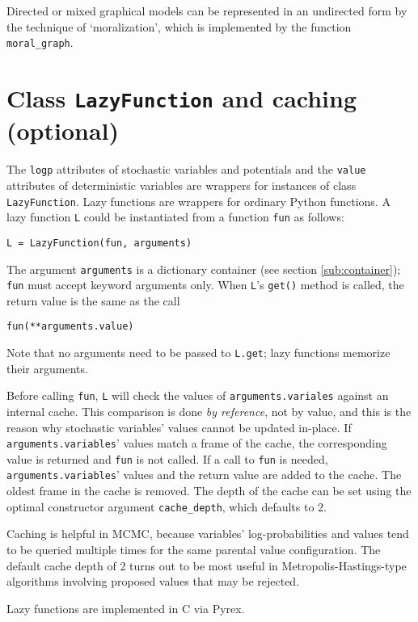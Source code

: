 Directed or mixed graphical models can be represented in an undirected form by the technique of `moralization', which is implemented by the function \texttt{moral_graph}.

\section{Class \texttt{LazyFunction} and caching (optional)}
\label{sec:caching} 

The \texttt{logp} attributes of stochastic variables and potentials and the \texttt{value} attributes of deterministic variables are wrappers for instances of class \texttt{LazyFunction}. Lazy functions are wrappers for ordinary Python functions. A lazy function \texttt{L} could be instantiated from a function \texttt{fun} as follows:
\begin{verbatim}
L = LazyFunction(fun, arguments)
\end{verbatim}
The argument \texttt{arguments} is a dictionary container (see section \ref{sub:container}); \texttt{fun} must accept keyword arguments only. When \texttt{L}'s \texttt{get()} method is called, the return value is the same as the call 
\begin{verbatim}
fun(**arguments.value)
\end{verbatim}
Note that no arguments need to be passed to \texttt{L.get}; lazy functions memorize their arguments.

Before calling \texttt{fun}, \texttt{L} will check the values of \texttt{arguments.variales} against an internal cache. This comparison is done \emph{by reference}, not by value, and this is the reason why stochastic variables' values cannot be updated in-place. If \texttt{arguments.variables}' values match a frame of the cache, the corresponding value is returned and \texttt{fun} is not called. If a call to \texttt{fun} is needed, \texttt{arguments.variables}' values and the return value are added to the cache. The oldest frame in the cache is removed. The depth of the cache can be set using the optimal constructor argument \texttt{cache_depth}, which defaults to 2.

Caching is helpful in MCMC, because variables' log-probabilities and values tend to be queried multiple times for the same parental value configuration. The default cache depth of 2 turns out to be most useful in Metropolis-Hastings-type algorithms involving proposed values that may be rejected.

Lazy functions are implemented in C via Pyrex.


